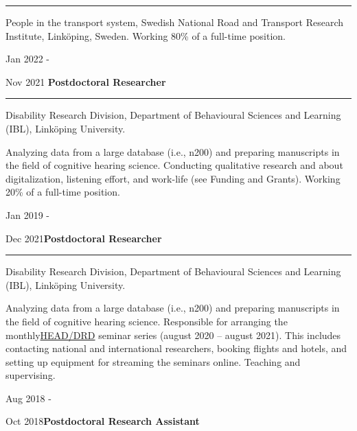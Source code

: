\documentclass[]{article}
\begin{document}
\hrule
\begin{changemargin}{2.3cm}{2.4cm}

People in the transport system, Swedish National Road and Transport Research Institute, Linköping, Sweden. Working 80\% of a full-time position.


\end{changemargin}

Jan 2022 -

Nov 2021 \hspace{0.75cm}\textbf{Postdoctoral Researcher}\vspace{1mm}

\hrule
\begin{changemargin}{2.3cm}{2.4cm}

Disability Research Division, Department of Behavioural Sciences and Learning (IBL), Linköping University.

Analyzing data from a large database (i.e., n200) and preparing manuscripts in the field of cognitive hearing science. Conducting qualitative research and about digitalization, listening effort, and work-life (see Funding and Grants). Working 20\% of a full-time position.

\end{changemargin}

Jan 2019 -

Dec 2021\hspace{0.78cm}\textbf{Postdoctoral Researcher}\vspace{1mm}

\hrule
\begin{changemargin}{2.3cm}{2.4cm}

Disability Research Division, Department of Behavioural Sciences and Learning (IBL), Linköping University.

Analyzing data from a large database (i.e., n200) and preparing manuscripts in the field of cognitive hearing science. Responsible for arranging the monthly\href{https://liu.se/linnecentrum-head/en}{HEAD/DRD} seminar series (august 2020 – august 2021). This includes contacting national and international researchers, booking flights and hotels, and setting up equipment for streaming the seminars online. Teaching and supervising.

\end{changemargin}

Aug 2018 -

Oct
2018\hspace{0.75cm}\textbf{Postdoctoral Research Assistant}\vspace{1mm}
\end{document}
